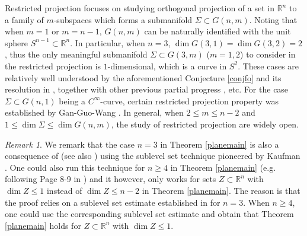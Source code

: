\documentclass[11pt,a4paper,reqno]{amsart}
\newcommand{\R}{\mathbb{R}}
\newcommand{\1}{\mathbf{1}}
\numberwithin{equation}{section}
\theoremstyle{plain}
\theoremstyle{definition}
\theoremstyle{remark}
\newtheorem{remark}[equation]{Remark}
\begin{document}
Restricted projection focuses on studying orthogonal projection of a set in $\R^n$ to a family of $m$-subspaces which forms a submanifold $\Sigma \subset G(n,m)$. Noting that when $m=1$ or $m=n-1$, $G(n,m)$ can be naturally identified with the unit sphere $S^{n-1} \subset \R^n$. In particular, when $n=3$, $\dim G(3,1) = \dim G(3,2) = 2$, thus the only meaningful submanifold $\Sigma \subset G(3,m)$ ($m=1,2$) to consider in the restricted projection is $1$-dimensional, which is a curve in $S^2$. These cases are relatively well understood by the aforementioned Conjecture \ref{conjfo} and its resolution in \cite{2022arXiv220702259P,gan2024}, together with other previous partial progress \cite{Jarvenpaa2008,FasslerOrponen14,Jarvenpaa2014,Chen2018,MR4148151,
OrponenVenieri2020,Harris2022,Harris2023,marstrandtype}, etc.
For the case $\Sigma \subset G(n,1)$ being a $C^\infty$-curve, certain restricted projection property was established by Gan-Guo-Wang \cite{gan2022restricted}.
In general, when $2 \le m \le n-2$ and $1 \le \dim \Sigma \le \dim G(n,m)$, the study of restricted projection are widely open.


\begin{remark} \label{level} \rm
   We remark that the case $n=3$ in Theorem \ref{planemain} is also a consequence of \cite[Theorem 3.2]{Jarvenpaa2008} (see also \cite[Proposition 1.5]{FasslerOrponen14}) using the sublevel set technique pioneered by Kaufman \cite{Kaufman1968}. One could also run this technique for $n \ge 4$ in Theorem \ref{planemain} (e.g. following Page 8-9 in \cite{FasslerOrponen14}) and it however, only works for sets $Z \subset \R^n$ with $\dim Z \le 1$ instead of $\dim Z \le n-2$ in Theorem \ref{planemain}. The reason is that the proof relies on a sublevel set estimate established in \cite[Lemma 3.3]{Christ1985} for $n=3$. When $n \ge 4$, one could use the corresponding sublevel set estimate \cite[Lemma 3.4]{Christ1985} and obtain that Theorem \ref{planemain} holds for $Z \subset \R^n$ with $\dim Z \le 1$.
\end{remark}
\end{document}
